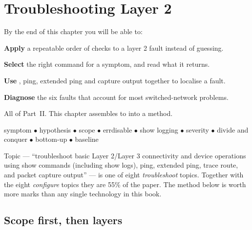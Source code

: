 \chapter{Troubleshooting Layer 2}\label{ch:tshootl2}

\begin{outcomes}
By the end of this chapter you will be able to:
\begin{tight}
  \item \textbf{Apply} a repeatable order of checks to a layer 2 fault instead of
        guessing.
  \item \textbf{Select} the right  command for a symptom, and read what
        it returns.
  \item \textbf{Use} , ping, extended ping and capture output
        together to localise a fault.
  \item \textbf{Diagnose} the six faults that account for most switched-network
        problems.
\end{tight}
\end{outcomes}

\begin{prereq}
All of Part~II. This chapter assembles  to  into a
method.
\end{prereq}

\begin{keyterms}
symptom $\bullet$ hypothesis $\bullet$ scope $\bullet$ errdisable $\bullet$
show logging $\bullet$ severity $\bullet$ divide and conquer $\bullet$
bottom-up $\bullet$ baseline
\end{keyterms}

\begin{examnote}
Topic  --- ``troubleshoot basic Layer 2/Layer 3 connectivity and device
operations using show commands (including show logs), ping, extended ping, trace
route, and packet capture output'' --- is one of eight \emph{troubleshoot} topics.
Together with the eight \emph{configure} topics they are 55\% of the paper. The
method below is worth more marks than any single technology in this book.
\end{examnote}

\section{Scope first, then layers}

